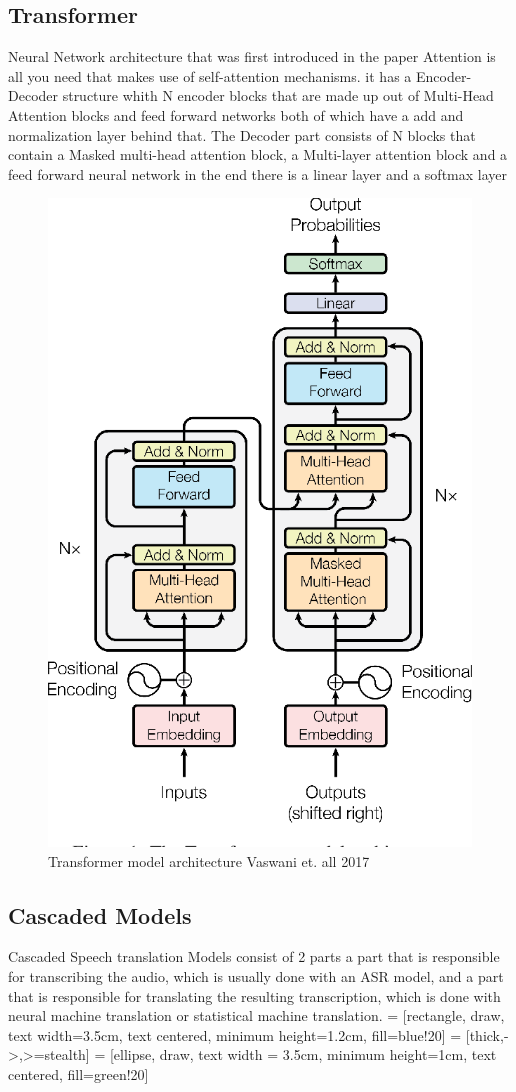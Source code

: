 \subsection{Transformer}
Neural Network architecture that was first introduced in the paper Attention is all you need \cite{vaswani2023attentionneed} that makes use of self-attention mechanisms. it has a Encoder-Decoder structure whith N encoder blocks that are made up out of Multi-Head Attention blocks and feed forward networks both of which have a add and normalization layer behind that. The Decoder part consists of N blocks that contain a Masked multi-head attention block, a Multi-layer attention block and a feed forward neural network 
in the end there is a linear layer and a softmax layer

\begin{figure}
        \centering
        \includegraphics[width=0.5\linewidth]{Latex//sections//images/transformermodel.png}
        \caption{Transformer model architecture Vaswani et. all 2017}
        \label{fig:enter-label}
    \end{figure}


\subsection{Cascaded Models}
Cascaded Speech translation Models consist of 2 parts a part that is responsible for transcribing the audio, which is usually done with an ASR model, and a part that is responsible for translating the resulting transcription, which is done with neural machine translation or statistical machine translation. 
 = [rectangle, draw, text width=3.5cm, text centered, minimum height=1.2cm, fill=blue!20]
 = [thick,->,>=stealth]
 = [ellipse, draw, text width = 3.5cm, minimum height=1cm, text centered, fill=green!20]


